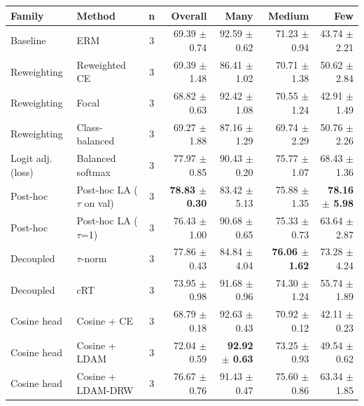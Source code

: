 \begin{tabular}{llcrrrr}
\toprule
Family & Method & n & Overall & Many & Medium & Few \\
\midrule
Baseline & ERM & 3 & 69.39 $\pm$ 0.74 & 92.59 $\pm$ 0.62 & 71.23 $\pm$ 0.94 & 43.74 $\pm$ 2.21 \\
Reweighting & Reweighted CE & 3 & 69.39 $\pm$ 1.48 & 86.41 $\pm$ 1.02 & 70.71 $\pm$ 1.38 & 50.62 $\pm$ 2.84 \\
Reweighting & Focal & 3 & 68.82 $\pm$ 0.63 & 92.42 $\pm$ 1.08 & 70.55 $\pm$ 1.24 & 42.91 $\pm$ 1.49 \\
Reweighting & Class-balanced & 3 & 69.27 $\pm$ 1.88 & 87.16 $\pm$ 1.29 & 69.74 $\pm$ 2.29 & 50.76 $\pm$ 2.26 \\
Logit adj. (loss) & Balanced softmax & 3 & 77.97 $\pm$ 0.85 & 90.43 $\pm$ 0.20 & 75.77 $\pm$ 1.07 & 68.43 $\pm$ 1.36 \\
Post-hoc & Post-hoc LA ($\tau$ on val) & 3 & \textbf{78.83 $\pm$ 0.30} & 83.42 $\pm$ 5.13 & 75.88 $\pm$ 1.35 & \textbf{78.16 $\pm$ 5.98} \\
Post-hoc & Post-hoc LA ($\tau$=1) & 3 & 76.43 $\pm$ 1.00 & 90.68 $\pm$ 0.65 & 75.33 $\pm$ 0.73 & 63.64 $\pm$ 2.87 \\
Decoupled & $\tau$-norm & 3 & 77.86 $\pm$ 0.43 & 84.84 $\pm$ 4.04 & \textbf{76.06 $\pm$ 1.62} & 73.28 $\pm$ 4.24 \\
Decoupled & cRT & 3 & 73.95 $\pm$ 0.98 & 91.68 $\pm$ 0.96 & 74.30 $\pm$ 1.24 & 55.74 $\pm$ 1.89 \\
Cosine head & Cosine + CE & 3 & 68.79 $\pm$ 0.18 & 92.63 $\pm$ 0.43 & 70.92 $\pm$ 0.12 & 42.11 $\pm$ 0.23 \\
Cosine head & Cosine + LDAM & 3 & 72.04 $\pm$ 0.59 & \textbf{92.92 $\pm$ 0.63} & 73.25 $\pm$ 0.93 & 49.54 $\pm$ 0.62 \\
Cosine head & Cosine + LDAM-DRW & 3 & 76.67 $\pm$ 0.76 & 91.43 $\pm$ 0.47 & 75.60 $\pm$ 0.86 & 63.34 $\pm$ 1.85 \\
\bottomrule
\end{tabular}
